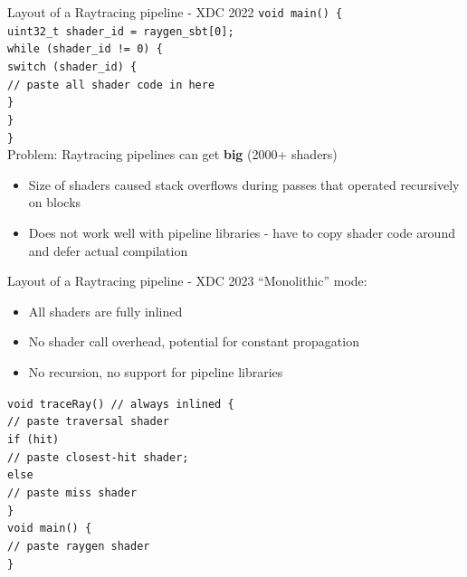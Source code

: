 \documentclass[aspectratio=169,t]{beamer}
\begin{document}
\begin{slide}{Layout of a Raytracing pipeline - XDC 2022}
  \texttt{void main() \{ \\
  \hspace*{8pt}uint32\_t shader\_id = raygen\_sbt[0]; \\
  \hspace*{8pt}while (shader\_id != 0) \{ \\
  \hspace*{16pt}switch (shader\_id) \{ \\
  \hspace*{24pt}// paste all shader code in here \\
  \hspace*{16pt}\} \\
  \hspace*{8pt}\} \\
  \}} \\
 Problem: Raytracing pipelines can get \textbf{big} (2000+ shaders)
 \begin{itemize}
  \item Size of shaders caused stack overflows during passes that operated recursively on blocks
  \item Does not work well with pipeline libraries - have to copy shader code around and defer actual compilation
 \end{itemize}
\end{slide}

\begin{slide}{Layout of a Raytracing pipeline - XDC 2023}
 ``Monolithic'' mode:
 \begin{itemize}
  \item All shaders are fully inlined
  \item No shader call overhead, potential for constant propagation
  \item No recursion, no support for pipeline libraries
 \end{itemize}
  \texttt{void traceRay() // always inlined \{ \\
  \hspace*{8pt}// paste traversal shader \\
  \hspace*{8pt}if (hit) \\
  \hspace*{16pt}// paste closest-hit shader; \\
  \hspace*{8pt}else \\
  \hspace*{16pt}// paste miss shader \\
  \}} \\
  \texttt{void main() \{ \\
  \hspace*{8pt}// paste raygen shader \\
  \}} \\
\end{slide}
\end{document}
